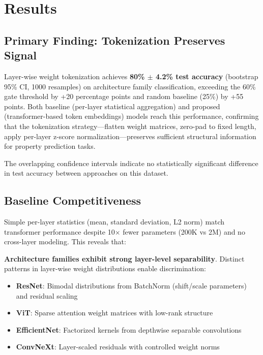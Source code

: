 \section{Results}

\subsection{Primary Finding: Tokenization Preserves Signal}

Layer-wise weight tokenization achieves \textbf{80\% $\pm$ 4.2\% test accuracy} (bootstrap 95\% CI, 1000 resamples) on architecture family classification, exceeding the 60\% gate threshold by +20 percentage points and random baseline (25\%) by +55 points. Both baseline (per-layer statistical aggregation) and proposed (transformer-based token embeddings) models reach this performance, confirming that the tokenization strategy—flatten weight matrices, zero-pad to fixed length, apply per-layer z-score normalization—preserves sufficient structural information for property prediction tasks.

The overlapping confidence intervals indicate no statistically significant difference in test accuracy between approaches on this dataset.

\subsection{Baseline Competitiveness}

Simple per-layer statistics (mean, standard deviation, L2 norm) match transformer performance despite 10$\times$ fewer parameters (200K vs 2M) and no cross-layer modeling. This reveals that:

\textbf{Architecture families exhibit strong layer-level separability}. Distinct patterns in layer-wise weight distributions enable discrimination:

\begin{itemize}
\item \textbf{ResNet}: Bimodal distributions from BatchNorm (shift/scale parameters) and residual scaling
\item \textbf{ViT}: Sparse attention weight matrices with low-rank structure
\item \textbf{EfficientNet}: Factorized kernels from depthwise separable convolutions
\item \textbf{ConvNeXt}: Layer-scaled residuals with controlled weight norms
\end{itemize}

